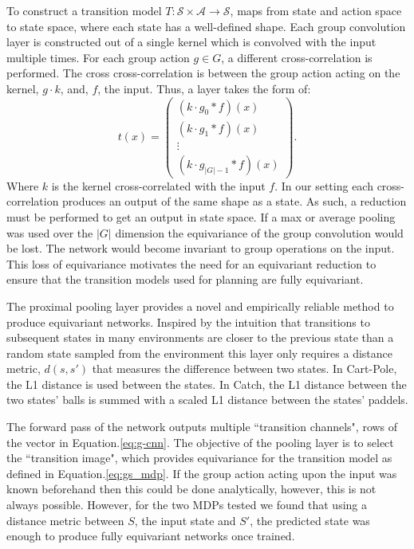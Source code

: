 \documentclass[mlabstract]{jmlr}
\begin{document}
To construct a transition model $T: \mathcal{S} \times \mathcal{A} \rightarrow \mathcal{S}$, maps from state and action space to state space, where each state has a well-defined shape. Each group convolution layer is constructed out of a single kernel which is convolved with the input multiple times. For each group action $g \in G$, a different cross-correlation is performed. The cross cross-correlation is between the group action acting on the kernel, $g\cdot k$, and, $f$, the input. Thus, a layer takes the form of:
\begin{equation}
	t(x) = \begin{pmatrix}
		(k \cdot g_0* f )(x)  \\
		(k \cdot g_1 * f )(x) \\
		\vdots                \\
		(k \cdot g_{|G|-1} * f)(x)
	\end{pmatrix}.
	\label{eq:g-cnn}
\end{equation}
Where $k$ is the kernel cross-correlated with the input $f$. In our setting each cross-correlation produces an output of the same shape as a state. As such, a reduction must be performed to get an output in state space. If a max or average pooling was used over the $|G|$ dimension the equivariance of the group convolution would be lost. The network would become invariant to group operations on the input. This loss of equivariance motivates the need for an equivariant reduction to ensure that the transition models used for planning are fully equivariant.

The proximal pooling layer provides a novel and empirically reliable method to produce equivariant networks. Inspired by the intuition that transitions to subsequent states in many environments are closer to the previous state than a random state sampled from the environment this layer only requires a distance metric, $d(s, s')$ that measures the difference between two states. In Cart-Pole, the L1 distance is used between the states. In Catch, the L1 distance between the two states' balls is summed with a scaled L1 distance between the states' paddels.

The forward pass of the network outputs multiple ``transition channels", rows of the vector in Equation.\ref{eq:g-cnn}. The objective of the pooling layer is to select the ``transition image", which provides equivariance for the transition model as defined in Equation.\ref{eq:gs_mdp}. If the group action acting upon the input was known beforehand then this could be done analytically, however, this is not always possible. However, for the two MDPs tested we found that using a distance metric between $S$, the input state and $S'$, the predicted state was enough to produce fully equivariant networks once trained.
\end{document}

